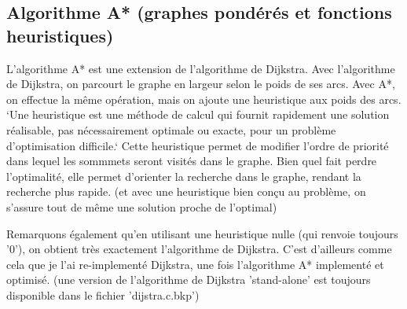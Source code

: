 \documentclass[a4paper,10pt]{article}
\begin{document}
      \subsection{Algorithme A* (graphes pondérés et fonctions heuristiques)}
    L'algorithme A* est une extension de l'algorithme de Dijkstra.\newline
    Avec l'algorithme de Dijkstra, on parcourt le graphe en largeur selon le poids de ses arcs.
    Avec A*, on effectue la même opération, mais on ajoute une heuristique aux poids des arcs.\newline
    `Une heuristique est une méthode de calcul qui fournit rapidement une solution réalisable,
    pas nécessairement optimale ou exacte, pour un problème d'optimisation difficile.`\newline
    Cette heuristique permet de modifier l'ordre de priorité dans lequel les sommmets seront visités dans le graphe.
    Bien quel fait perdre l'optimalité, elle permet d'orienter la recherche dans le graphe, rendant la recherche plus rapide.
    (et avec une heuristique bien conçu au problème, on s'assure tout de même une solution proche de l'optimal)\newline\newline
    
    Remarquons également qu'en utilisant une heuristique nulle (qui renvoie toujours '0'), on obtient très exactement l'algorithme de Dijkstra.
    C'est d'ailleurs comme cela que je l'ai re-implementé Dijkstra, une fois l'algorithme A* implementé et optimisé.\newline
    (une version de l'algorithme de Dijkstra 'stand-alone' est toujours disponible dans le fichier 'dijstra.c.bkp')\newline\newline
    
\end{document}
